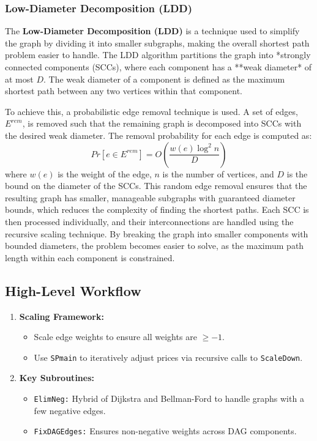 \documentclass{article}
\begin{document}
\subsubsection{Low-Diameter Decomposition (LDD)}
The \textbf{Low-Diameter Decomposition (LDD)} is a technique used to simplify the graph by dividing it into smaller subgraphs, making the overall shortest path problem easier to handle. The LDD algorithm partitions the graph into *strongly connected components (SCCs), where each component has a **weak diameter* of at most \( D \). The weak diameter of a component is defined as the maximum shortest path between any two vertices within that component.

To achieve this, a probabilistic edge removal technique is used. A set of edges, \( E^{rem} \), is removed such that the remaining graph is decomposed into SCCs with the desired weak diameter. The removal probability for each edge is computed as:
\[
Pr[e \in E^{rem}] = O \left( \frac{w(e) \log^2 n}{D} \right)
\]
where \( w(e) \) is the weight of the edge, \( n \) is the number of vertices, and \( D \) is the bound on the diameter of the SCCs. This random edge removal ensures that the resulting graph has smaller, manageable subgraphs with guaranteed diameter bounds, which reduces the complexity of finding the shortest paths. Each SCC is then processed individually, and their interconnections are handled using the recursive scaling technique. By breaking the graph into smaller components with bounded diameters, the problem becomes easier to solve, as the maximum path length within each component is constrained.

\subsection{High-Level Workflow}

\begin{enumerate}
    \item \textbf{Scaling Framework:} 
        \begin{itemize}
            \item Scale edge weights to ensure all weights are \( \geq -1 \).
            \item Use \texttt{SPmain} to iteratively adjust prices via recursive calls to \texttt{ScaleDown}.
        \end{itemize}
    \item \textbf{Key Subroutines:}
        \begin{itemize}
            \item \texttt{ElimNeg:} Hybrid of Dijkstra and Bellman-Ford to handle graphs with a few negative edges.
            \item \texttt{FixDAGEdges:} Ensures non-negative weights across DAG components.
        \end{itemize}
\end{enumerate}
\end{document}
